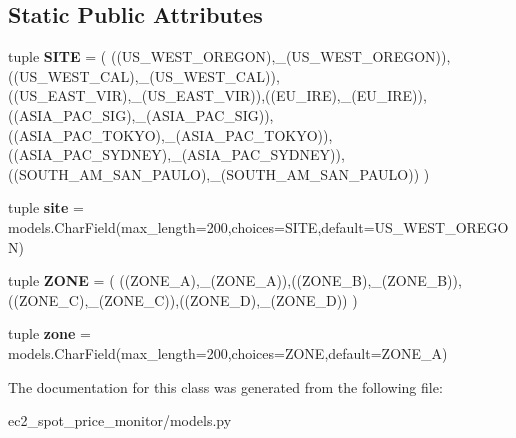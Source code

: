 \subsection*{Static Public Attributes}
\begin{DoxyCompactItemize}
\item 
\hypertarget{classec2__spot__price__monitor_1_1models_1_1Region_a79535994052ebf23138ede7cd74bf209}{tuple {\bfseries S\-I\-T\-E} = ( ((U\-S\-\_\-\-W\-E\-S\-T\-\_\-\-O\-R\-E\-G\-O\-N),\-\_\-(U\-S\-\_\-\-W\-E\-S\-T\-\_\-\-O\-R\-E\-G\-O\-N)),((U\-S\-\_\-\-W\-E\-S\-T\-\_\-\-C\-A\-L),\-\_\-(U\-S\-\_\-\-W\-E\-S\-T\-\_\-\-C\-A\-L)),((U\-S\-\_\-\-E\-A\-S\-T\-\_\-\-V\-I\-R),\-\_\-(U\-S\-\_\-\-E\-A\-S\-T\-\_\-\-V\-I\-R)),((E\-U\-\_\-\-I\-R\-E),\-\_\-(E\-U\-\_\-\-I\-R\-E)),((A\-S\-I\-A\-\_\-\-P\-A\-C\-\_\-\-S\-I\-G),\-\_\-(A\-S\-I\-A\-\_\-\-P\-A\-C\-\_\-\-S\-I\-G)),((A\-S\-I\-A\-\_\-\-P\-A\-C\-\_\-\-T\-O\-K\-Y\-O),\-\_\-(A\-S\-I\-A\-\_\-\-P\-A\-C\-\_\-\-T\-O\-K\-Y\-O)),((A\-S\-I\-A\-\_\-\-P\-A\-C\-\_\-\-S\-Y\-D\-N\-E\-Y),\-\_\-(A\-S\-I\-A\-\_\-\-P\-A\-C\-\_\-\-S\-Y\-D\-N\-E\-Y)),((S\-O\-U\-T\-H\-\_\-\-A\-M\-\_\-\-S\-A\-N\-\_\-\-P\-A\-U\-L\-O),\-\_\-(S\-O\-U\-T\-H\-\_\-\-A\-M\-\_\-\-S\-A\-N\-\_\-\-P\-A\-U\-L\-O)) )}\label{classec2__spot__price__monitor_1_1models_1_1Region_a79535994052ebf23138ede7cd74bf209}

\item 
\hypertarget{classec2__spot__price__monitor_1_1models_1_1Region_ab4508024c71519ef010bddf7b5dab11f}{tuple {\bfseries site} = models.\-Char\-Field(max\-\_\-length=200,choices=S\-I\-T\-E,default=U\-S\-\_\-\-W\-E\-S\-T\-\_\-\-O\-R\-E\-G\-O\-N)}\label{classec2__spot__price__monitor_1_1models_1_1Region_ab4508024c71519ef010bddf7b5dab11f}

\item 
\hypertarget{classec2__spot__price__monitor_1_1models_1_1Region_a60d1ffbbba1bb89e20e43c0ba033d17e}{tuple {\bfseries Z\-O\-N\-E} = ( ((Z\-O\-N\-E\-\_\-\-A),\-\_\-(Z\-O\-N\-E\-\_\-\-A)),((Z\-O\-N\-E\-\_\-\-B),\-\_\-(Z\-O\-N\-E\-\_\-\-B)),((Z\-O\-N\-E\-\_\-\-C),\-\_\-(Z\-O\-N\-E\-\_\-\-C)),((Z\-O\-N\-E\-\_\-\-D),\-\_\-(Z\-O\-N\-E\-\_\-\-D)) )}\label{classec2__spot__price__monitor_1_1models_1_1Region_a60d1ffbbba1bb89e20e43c0ba033d17e}

\item 
\hypertarget{classec2__spot__price__monitor_1_1models_1_1Region_a322c15a4dd3637672283ac82ecee77d9}{tuple {\bfseries zone} = models.\-Char\-Field(max\-\_\-length=200,choices=Z\-O\-N\-E,default=Z\-O\-N\-E\-\_\-\-A)}\label{classec2__spot__price__monitor_1_1models_1_1Region_a322c15a4dd3637672283ac82ecee77d9}

\end{DoxyCompactItemize}


The documentation for this class was generated from the following file\-:\begin{DoxyCompactItemize}
\item 
ec2\-\_\-spot\-\_\-price\-\_\-monitor/models.\-py\end{DoxyCompactItemize}
